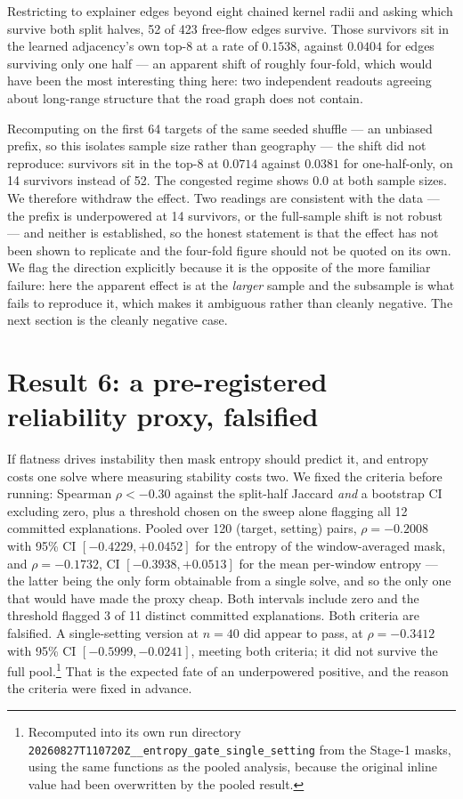 \documentclass{article}
\begin{document}
Restricting to explainer edges beyond eight chained kernel radii and asking which
survive both split halves, 52 of 423 free-flow edges survive. Those survivors sit in
the learned adjacency's own top-8 at a rate of $0.1538$, against $0.0404$ for edges
surviving only one half --- an apparent shift of roughly four-fold, which would have
been the most interesting thing here: two independent readouts agreeing about
long-range structure that the road graph does not contain.

Recomputing on the first 64 targets of the same seeded shuffle --- an unbiased
prefix, so this isolates sample size rather than geography --- the shift did not reproduce: survivors sit in the top-8 at $0.0714$ against $0.0381$ for
one-half-only, on 14 survivors instead of 52. The congested regime shows $0.0$ at
both sample sizes. We therefore withdraw the effect. Two readings are consistent
with the data --- the prefix is underpowered at 14 survivors, or the full-sample
shift is not robust --- and neither is established, so the honest statement is that
the effect has not been shown to replicate and the four-fold figure should not be
quoted on its own. We flag the direction explicitly because it is the opposite of
the more familiar failure: here the apparent effect is at the \emph{larger} sample
and the subsample is what fails to reproduce it, which makes it ambiguous rather
than cleanly negative. The next section is the cleanly negative case.

\section{Result 6: a pre-registered reliability proxy, falsified}

If flatness drives instability then mask entropy should predict it, and entropy costs
one solve where measuring stability costs two. We fixed the criteria before running:
Spearman $\rho < -0.30$ against the split-half Jaccard \emph{and} a bootstrap CI
excluding zero, plus a threshold chosen on the sweep alone flagging all 12 committed
explanations. Pooled over 120 (target, setting) pairs, $\rho = -0.2008$ with 95\% CI
$[-0.4229, +0.0452]$ for the entropy of the window-averaged mask, and
$\rho = -0.1732$, CI $[-0.3938, +0.0513]$ for the mean per-window entropy --- the
latter being the only form obtainable from a single solve, and so the only one that
would have made the proxy cheap. Both intervals include zero and the threshold
flagged 3 of 11 distinct committed explanations. Both criteria are falsified. A
single-setting version at $n{=}40$ did appear to pass, at $\rho = -0.3412$ with 95\%
CI $[-0.5999, -0.0241]$, meeting both criteria; it did not survive the full
pool.\footnote{Recomputed into its own run directory
\texttt{20260827T110720Z\_\_entropy\_\allowbreak gate\_single\_setting} from the
Stage-1 masks, using the same functions as the pooled analysis, because the original
inline value had been overwritten by the pooled result.} That is the expected fate of an
underpowered positive, and the reason the criteria were fixed in advance.
\end{document}
